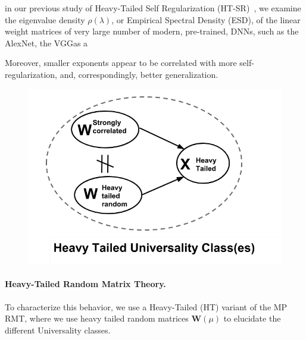
in our previous study of Heavy-Tailed Self Regularization (HT-SR)~\cite{MM18_TR}, we examine the eigenvalue density
$\rho(\lambda)$, or Empirical Spectral  Density (ESD), of the linear weight matrices of very large number of modern, pre-trained, DNNs,
such as the AlexNet, the VGGas a

Moreover, smaller exponents appear to be correlated with more self-regularization, and, correspondingly, 
better generalization.

\begin{figure}[!htb]
   \centering
   \includegraphics[scale=0.40]{img/universality_classes.png} 
   \caption{}
   \label{fig:universality_diagram}
\end{figure}

\paragraph{Heavy-Tailed Random Matrix Theory.} 


To characterize this behavior, we use a Heavy-Tailed (HT) variant of the MP RMT, where we use
heavy tailed random matrices $\mathbf{W}(\mu)$ to elucidate the different Universality classes.



